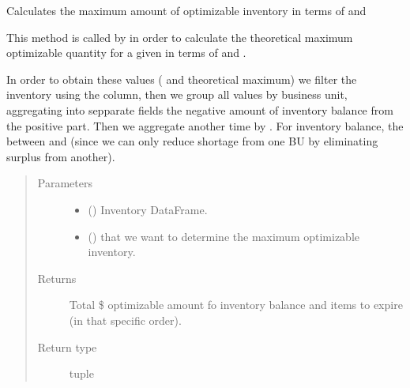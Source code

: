 \documentclass[letterpaper,10pt,english]{sphinxmanual}
\begin{document}
\begin{fulllineitems}
\label{\detokenize{source/optimization.datatools:optimization.datatools.extra_output.optimizable}}
Calculates the maximum amount of optimizable inventory in terms of  and 

This method is called by 
in order to calculate the theoretical maximum optimizable quantity for a given  in terms of  and .

In order to obtain these values ( and  theoretical maximum) we filter the inventory using the  column,
then we group all values by business unit, aggregating into sepparate fields the negative amount of inventory balance from the positive part. Then we aggregate
another time by . For inventory balance, the  between  and 
(since we can only reduce shortage from one BU by eliminating surplus from another).
\begin{quote}\begin{description}
\item[{Parameters}] \leavevmode\begin{itemize}
\item {} 
 () \textendash{} Inventory DataFrame.

\item {} 
 () \textendash{}  that we want to determine the maximum optimizable inventory.

\end{itemize}

\item[{Returns}] \leavevmode
Total \$ optimizable amount fo inventory balance and items to expire (in that specific order).

\item[{Return type}] \leavevmode
tuple

\end{description}\end{quote}

\end{fulllineitems}
\end{document}

